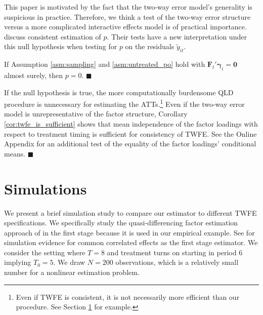 \begin{remark}\label{remark:twfe_testing}
  This paper is motivated by the fact that the two-way error model's generality is suspicious in practice. Therefore, we think a test of the two-way error structure versus a more complicated interactive effects model is of practical importance. \citet{Ahn_Lee_Schmidt_2013} discuss consistent estimation of $p$. Their tests have a new interpretation under this null hypothesis when testing for $p$ on the residuals $\tilde{y}_{it}$.

  \begin{theorem}
    If Assumption \ref{asm:sampling} and \ref{asm:untreated_po} hold with $\bm{F}_t' \bm \gamma_i = \bm 0$ almost surely, then $p = 0$. $\blacksquare$
  \end{theorem}
  If the null hypothesis is true, the more computationally burdensome QLD procedure is unnecessary for estimating the ATTs.\footnote{Even if TWFE is consistent, it is not necessarily more efficient than our procedure. See Section \ref{sec:simulations} for example.} Even if the two-way error model is unrepresentative of the factor structure, Corollary \ref{cor:twfe_is_sufficient} shows that mean independence of the factor loadings with respect to treatment timing is sufficient for consistency of TWFE. See the Online Appendix for an additional test of the equality of the factor loadings' conditional means. $\blacksquare$
\end{remark}


\section{Simulations}\label{sec:simulations}

We present a brief simulation study to compare our estimator to different TWFE specifications. We specifically study the quasi-differencing factor estimation approach of \citet{Ahn_Lee_Schmidt_2013} in the first stage because it is used in our empirical example. See \citet{Brown_Butts_Westerlund_2023} for simulation evidence for common correlated effects as the first stage estimator. We consider the setting where $T = 8$ and treatment turns on starting in period 6 implying $T_0 = 5$. We draw $N = 200$ observations, which is a relatively small number for a nonlinear estimation problem.

